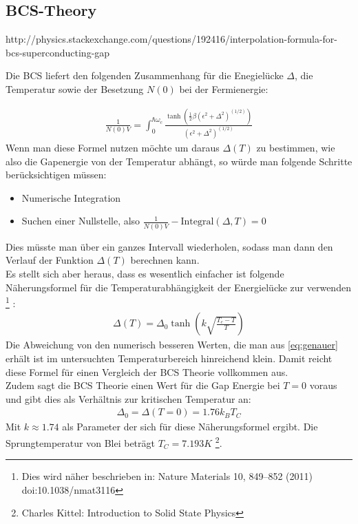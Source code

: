 \documentclass[twoside,        %
               BCOR12mm,       %
               english,ngerman, %
               fleqn,headsepline=false,footsepline=false
              ]{MFPREPORT}
\begin{document}
\subsection{BCS-Theory}

http://physics.stackexchange.com/questions/192416/interpolation-formula-for-bcs-superconducting-gap

Die BCS liefert den folgenden Zusammenhang für die Enegielücke $\Delta$, die Temperatur sowie der Besetzung $N(0)$ bei der Fermienergie:

\begin{align}
\frac{1}{N(0) V} = \int_{0}^{\hbar \omega_c} \frac{\tanh \left( \frac{1}{2} \beta (\epsilon^2 + \Delta^2)^(1/2) \right) }{(\epsilon^2 + \Delta^2)^(1/2)}
\label{eq:genauer}
\end{align}
Wenn man diese Formel nutzen möchte um daraus $\Delta(T)$ zu bestimmen, wie also die Gapenergie von der Temperatur abhängt, so würde man folgende Schritte berücksichtigen müssen:
\begin{itemize}
\item Numerische Integration 
\item Suchen einer Nullstelle, also $\frac{1}{N(0) V} - \text{Integral}(\Delta, T) = 0$
\end{itemize}
Dies müsste man über ein ganzes Intervall wiederholen, sodass man dann den Verlauf der Funktion $\Delta(T)$ berechnen kann.
\\
Es stellt sich aber heraus, dass es wesentlich einfacher ist folgende Näherungsformel für die Temperaturabhängigkeit der Energielücke zur verwenden
\footnote{Dies wird näher beschrieben in:
    Nature Materials
    10,
    849–852
    (2011)
    doi:10.1038/nmat3116}
:
\begin{align}
\Delta(T) = \Delta_{0} \tanh \left( k \sqrt{\frac{T_{c}-T}{T}} \right)
\end{align}
Die Abweichung von den numerisch besseren Werten, die man aus \ref{eq:genauer} erhält ist im untersuchten Temperaturbereich hinreichend klein. 
Damit reicht diese Formel für einen Vergleich der BCS Theorie vollkommen aus.
\\
Zudem sagt die BCS Theorie einen Wert für die Gap Energie bei $T=0$ voraus und gibt dies als Verhältnis zur kritischen Temperatur an:
\begin{align}
\Delta_{0}
=
\Delta(T=0)
= 1.76 k_{B} T_{C}
\end{align}
Mit $k \approx1.74$ als Parameter der sich für diese Näherungsformel ergibt.
Die Sprungtemperatur von Blei beträgt $T_{C} = 7.193 K$ 
\footnote{Charles Kittel: Introduction to Solid State Physics}.
\end{document}
